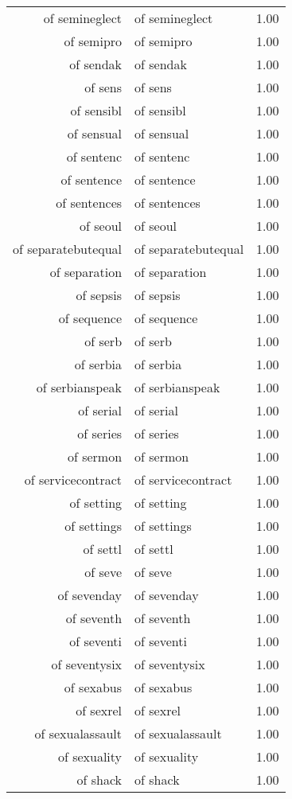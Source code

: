 \begin{table}[ht]
\begin{tabular}{rlr}
  of semineglect & of semineglect & 1.00 \\ 
  of semipro & of semipro & 1.00 \\ 
  of sendak & of sendak & 1.00 \\ 
  of sens & of sens & 1.00 \\ 
  of sensibl & of sensibl & 1.00 \\ 
  of sensual & of sensual & 1.00 \\ 
  of sentenc & of sentenc & 1.00 \\ 
  of sentence & of sentence & 1.00 \\ 
  of sentences & of sentences & 1.00 \\ 
  of seoul & of seoul & 1.00 \\ 
  of separatebutequal & of separatebutequal & 1.00 \\ 
  of separation & of separation & 1.00 \\ 
  of sepsis & of sepsis & 1.00 \\ 
  of sequence & of sequence & 1.00 \\ 
  of serb & of serb & 1.00 \\ 
  of serbia & of serbia & 1.00 \\ 
  of serbianspeak & of serbianspeak & 1.00 \\ 
  of serial & of serial & 1.00 \\ 
  of series & of series & 1.00 \\ 
  of sermon & of sermon & 1.00 \\ 
  of servicecontract & of servicecontract & 1.00 \\ 
  of setting & of setting & 1.00 \\ 
  of settings & of settings & 1.00 \\ 
  of settl & of settl & 1.00 \\ 
  of seve & of seve & 1.00 \\ 
  of sevenday & of sevenday & 1.00 \\ 
  of seventh & of seventh & 1.00 \\ 
  of seventi & of seventi & 1.00 \\ 
  of seventysix & of seventysix & 1.00 \\ 
  of sexabus & of sexabus & 1.00 \\ 
  of sexrel & of sexrel & 1.00 \\ 
  of sexualassault & of sexualassault & 1.00 \\ 
  of sexuality & of sexuality & 1.00 \\ 
  of shack & of shack & 1.00 \\ 

\end{tabular}
\end{table}
